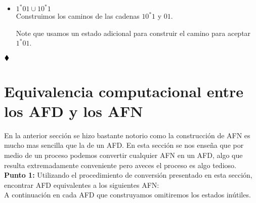 \begin{itemize}[label={$\bullet$}]
        \item $1^*01\cup10^*1$\\

         Construimos los caminos de las cadenas $10^*1$ y $01$.
          
        \begin{basedtikz}
        \centering
        \end{basedtikz}
        Note que usamos un estado adicional para construir el camino para aceptar $1^*01$.
    \end{itemize}

    $\hfill \blacklozenge$

    \section{Equivalencia computacional entre los AFD y los AFN}

    En la anterior sección se hizo bastante notorio como la construcción de AFN es mucho mas sencilla que la de un AFD. En esta sección se nos enseña que por medio de un proceso podemos convertir cualquier AFN en un AFD, algo que resulta extremadamente conveniente pero aveces el proceso es algo tedioso.\\ 

    \textbf{Punto 1: }Utilizando el procedimiento de conversión presentado en esta sección, encontrar AFD equivalentes a los siguientes AFN:\\ 
    A continuación en cada AFD que construyamos omitiremos los estados inútiles.\\

